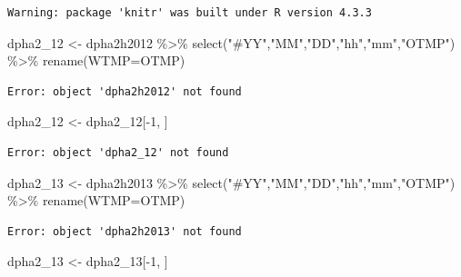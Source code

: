 \documentclass[
  letterpaper,
  DIV=11,
  numbers=noendperiod]{scrreprt}
\newenvironment{Shaded}{\begin{snugshade}}{\end{snugshade}}
\newcommand{\AttributeTok}[1]{\textcolor[rgb]{0.40,0.45,0.13}{#1}}
\newcommand{\DecValTok}[1]{\textcolor[rgb]{0.68,0.00,0.00}{#1}}
\newcommand{\FunctionTok}[1]{\textcolor[rgb]{0.28,0.35,0.67}{#1}}
\newcommand{\NormalTok}[1]{\textcolor[rgb]{0.00,0.23,0.31}{#1}}
\newcommand{\OtherTok}[1]{\textcolor[rgb]{0.00,0.23,0.31}{#1}}
\newcommand{\SpecialCharTok}[1]{\textcolor[rgb]{0.37,0.37,0.37}{#1}}
\newcommand{\StringTok}[1]{\textcolor[rgb]{0.13,0.47,0.30}{#1}}
\begin{document}
\begin{verbatim}
Warning: package 'knitr' was built under R version 4.3.3
\end{verbatim}

\begin{Shaded}
\begin{Highlighting}[]
\NormalTok{dpha2\_12 }\OtherTok{\textless{}{-}}\NormalTok{ dpha2h2012 }\SpecialCharTok{\%\textgreater{}\%} \FunctionTok{select}\NormalTok{(}\StringTok{"\#YY"}\NormalTok{,}\StringTok{"MM"}\NormalTok{,}\StringTok{"DD"}\NormalTok{,}\StringTok{"hh"}\NormalTok{,}\StringTok{"mm"}\NormalTok{,}\StringTok{"OTMP"}\NormalTok{) }\SpecialCharTok{\%\textgreater{}\%}
   \FunctionTok{rename}\NormalTok{(}\AttributeTok{WTMP=}\NormalTok{OTMP)}
\end{Highlighting}
\end{Shaded}

\begin{verbatim}
Error: object 'dpha2h2012' not found
\end{verbatim}

\begin{Shaded}
\begin{Highlighting}[]
\NormalTok{dpha2\_12 }\OtherTok{\textless{}{-}}\NormalTok{ dpha2\_12[}\SpecialCharTok{{-}}\DecValTok{1}\NormalTok{, ]}
\end{Highlighting}
\end{Shaded}

\begin{verbatim}
Error: object 'dpha2_12' not found
\end{verbatim}

\begin{Shaded}
\begin{Highlighting}[]
\NormalTok{dpha2\_13 }\OtherTok{\textless{}{-}}\NormalTok{ dpha2h2013 }\SpecialCharTok{\%\textgreater{}\%} \FunctionTok{select}\NormalTok{(}\StringTok{"\#YY"}\NormalTok{,}\StringTok{"MM"}\NormalTok{,}\StringTok{"DD"}\NormalTok{,}\StringTok{"hh"}\NormalTok{,}\StringTok{"mm"}\NormalTok{,}\StringTok{"OTMP"}\NormalTok{) }\SpecialCharTok{\%\textgreater{}\%}
   \FunctionTok{rename}\NormalTok{(}\AttributeTok{WTMP=}\NormalTok{OTMP)}
\end{Highlighting}
\end{Shaded}

\begin{verbatim}
Error: object 'dpha2h2013' not found
\end{verbatim}

\begin{Shaded}
\begin{Highlighting}[]
\NormalTok{dpha2\_13 }\OtherTok{\textless{}{-}}\NormalTok{ dpha2\_13[}\SpecialCharTok{{-}}\DecValTok{1}\NormalTok{, ]}
\end{Highlighting}
\end{Shaded}
\end{document}
